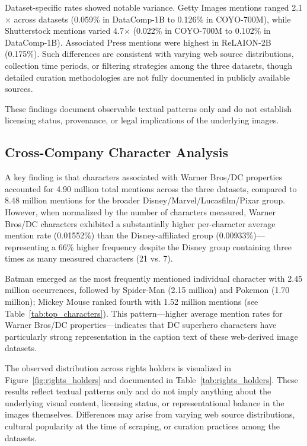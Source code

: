 \documentclass[11pt]{article}
\begin{document}
Dataset-specific rates showed notable variance. Getty Images mentions ranged 2.1$\times$ across datasets (0.059\% in DataComp-1B to 0.126\% in COYO-700M), while Shutterstock mentions varied 4.7$\times$ (0.022\% in COYO-700M to 0.102\% in DataComp-1B). Associated Press mentions were highest in ReLAION-2B (0.175\%). Such differences are consistent with varying web source distributions, collection time periods, or filtering strategies among the three datasets, though detailed curation methodologies are not fully documented in publicly available sources.

These findings document observable textual patterns only and do not establish licensing status, provenance, or legal implications of the underlying images.

\subsection{Cross-Company Character Analysis}
A key finding is that characters associated with Warner Bros/DC properties accounted for 4.90 million total mentions across the three datasets, compared to 8.48 million mentions for the broader Disney/Marvel/Lucasfilm/Pixar group. However, when normalized by the number of characters measured, Warner Bros/DC characters exhibited a substantially higher per-character average mention rate (0.01552\%) than the Disney-affiliated group (0.00933\%)---representing a 66\% higher frequency despite the Disney group containing three times as many measured characters (21 vs. 7).

Batman emerged as the most frequently mentioned individual character with 2.45 million occurrences, followed by Spider-Man (2.15 million) and Pokemon (1.70 million); Mickey Mouse ranked fourth with 1.52 million mentions (see Table~\ref{tab:top_characters}). This pattern---higher average mention rates for Warner Bros/DC properties---indicates that DC superhero characters have particularly strong representation in the caption text of these web-derived image datasets.

The observed distribution across rights holders is visualized in Figure~\ref{fig:rights_holders} and documented in Table~\ref{tab:rights_holders}. These results reflect textual patterns only and do not imply anything about the underlying visual content, licensing status, or representational balance in the images themselves. Differences may arise from varying web source distributions, cultural popularity at the time of scraping, or curation practices among the datasets.
\end{document}
